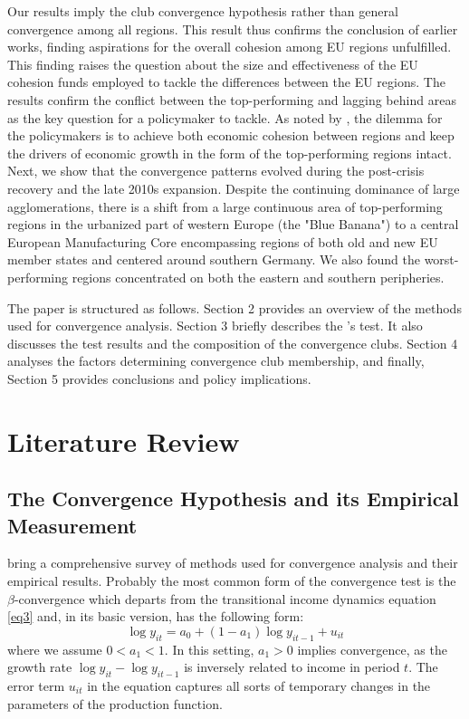 \documentclass[11pt]{article}
\begin{document}
Our results imply the club convergence hypothesis rather than general convergence among all regions. This result thus confirms the conclusion of earlier works, finding aspirations for the overall cohesion among EU regions unfulfilled. This finding raises the question about the size and effectiveness of the EU cohesion funds employed to tackle the differences between the EU regions. The results confirm the conflict between the top-performing and lagging behind areas as the key question for a policymaker to tackle. As noted by \citep{iammarino2017regional}, the dilemma for the policymakers is to achieve both economic cohesion between regions and keep the drivers of economic growth in the form of the top-performing regions intact. Next, we show that the convergence patterns evolved during the post-crisis recovery and the late 2010s expansion. Despite the continuing dominance of large agglomerations, there is a shift from a large continuous area of top-performing regions in the urbanized part of western Europe (the "Blue Banana") to a central European Manufacturing Core encompassing regions of both old and new EU member states and centered around southern Germany. We also found the worst-performing regions concentrated on both the eastern and southern peripheries.


The paper is structured as follows. Section 2 provides an overview of the methods used for convergence analysis. Section 3 briefly describes the \citeauthor{phillips2007transition}'s test. It also discusses the test results and the composition of the convergence clubs. Section 4 analyses the factors determining convergence club membership, and finally, Section 5 provides conclusions and policy implications.  


\section{Literature Review}\label{Methodology}
\subsection{The Convergence Hypothesis and its Empirical Measurement}

\citet{eckey2007convergence} bring a comprehensive survey of methods used for convergence analysis and their empirical results. Probably the most common form of the convergence test is the $\beta$-convergence which departs from the transitional income dynamics equation \eqref{eq3} and, in its basic version, has the following form:
\begin{equation} \label{eq1}\log y_{it} = a_{0} + (1 - a_{1})\log y_{it-1} + u_{it} \end{equation}
where we assume \(0 < a_{1} < 1\). In this setting, \(a_{1} > 0 \) implies convergence, as the growth rate \(\log y_{it} - \log y_{it-1}\) is inversely related to income in period $t$. The error term $u_{it}$ in the equation captures all sorts of temporary changes in the parameters of the production function.
\end{document}
